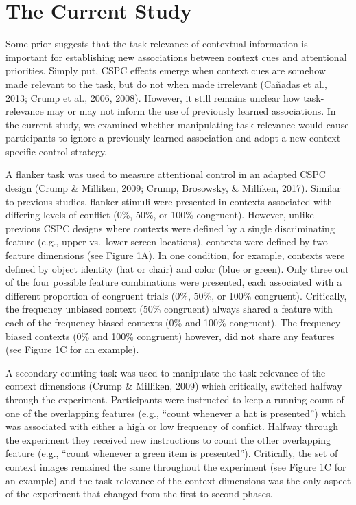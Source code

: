 \documentclass[english,,man,floatsintext]{apa6}
\begin{document}
\section{The Current Study}\label{the-current-study}

Some prior suggests that the task-relevance of contextual information is
important for establishing new associations between context cues and
attentional priorities. Simply put, CSPC effects emerge when context
cues are somehow made relevant to the task, but do not when made
irrelevant (Cañadas et al., 2013; Crump et al., 2006, 2008). However, it
still remains unclear how task-relevance may or may not inform the use
of previously learned associations. In the current study, we examined
whether manipulating task-relevance would cause participants to ignore a
previously learned association and adopt a new context-specific control
strategy.

A flanker task was used to measure attentional control in an adapted
CSPC design (Crump \& Milliken, 2009; Crump, Brosowsky, \& Milliken,
2017). Similar to previous studies, flanker stimuli were presented in
contexts associated with differing levels of conflict (0\%, 50\%, or
100\% congruent). However, unlike previous CSPC designs where contexts
were defined by a single discriminating feature (e.g., upper vs.~lower
screen locations), contexts were defined by two feature dimensions (see
Figure 1A). In one condition, for example, contexts were defined by
object identity (hat or chair) and color (blue or green). Only three out
of the four possible feature combinations were presented, each
associated with a different proportion of congruent trials (0\%, 50\%,
or 100\% congruent). Critically, the frequency unbiased context (50\%
congruent) always shared a feature with each of the frequency-biased
contexts (0\% and 100\% congruent). The frequency biased contexts (0\%
and 100\% congruent) however, did not share any features (see Figure 1C
for an example).

A secondary counting task was used to manipulate the task-relevance of
the context dimensions (Crump \& Milliken, 2009) which critically,
switched halfway through the experiment. Participants were instructed to
keep a running count of one of the overlapping features (e.g.,
\enquote{count whenever a hat is presented}) which was associated with
either a high or low frequency of conflict. Halfway through the
experiment they received new instructions to count the other overlapping
feature (e.g., \enquote{count whenever a green item is presented}).
Critically, the set of context images remained the same throughout the
experiment (see Figure 1C for an example) and the task-relevance of the
context dimensions was the only aspect of the experiment that changed
from the first to second phases.
\end{document}
